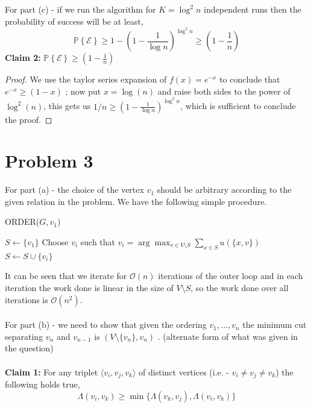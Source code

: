 \documentclass{article}
\numberwithin{equation}{section}
\newcommand{\bigOh}[1]{\mathcal{O}\left(#1\right)}
\newcommand{\curlyBrace}[1]{\left\{#1\right\}}
\newcommand{\roundBrace}[1]{\left(#1\right)}
\newcommand{\probsymb}[1]{\mathbb{P}\curlyBrace{#1}}
\begin{document}
\noindent For part (c) - if we run the algorithm for  $K = \log^2 n$ independent runs then the probability of success will be at least, 
\begin{equation}
    \probsymb{\mathcal{E}} \ge 1 - \roundBrace{1 - \frac{1}{\log n}}^{\log^2 n} \ge \roundBrace{1- \frac{1}{n}}
\end{equation}
\textbf{Claim 2:} $\probsymb{\mathcal{E}} 
\ge \roundBrace{1- \frac{1}{n}}$
\begin{proof}
    We use the taylor series expansion of $f(x) = e^{-x}$ to conclude that $e^{-x}\ge (1-x)$ ; now put $x = \log(n)$ and raise both sides to the power of $\log^2(n)$, this gets us $1/n \ge \roundBrace{1 - \frac{1}{\log n}}^{\log^2 n}$, which is sufficient to conclude the proof. 
\end{proof}
\newpage
\section{Problem 3} %
For part (a) - the choice of the vertex $v_1$ should be arbitrary according to the given relation in the problem. We have the following simple procedure.
\begin{algorithm}[H]
    \caption{ORDER($G, v_1$)}
    \begin{algorithmic}[1]
        \State $S\leftarrow\{v_1\}$ 
            \State Choose $v_i$ such that $v_i = \arg\max_{v \in V\setminus S} \sum_{x \in S} u(\{x, v\})$ 
            \State $S\leftarrow S\cup \{v_i\}$ 
        \EndFor
    \end{algorithmic}
\end{algorithm}
It can be seen that we iterate for $\bigOh{n}$ iterations of the outer loop and in each iteration the work done is linear in the size of $V\setminus S$, so the work done over all iterations is $\bigOh{n^2}$. \\\\
For part (b) - we need to show that given the ordering $v_1, \dots, v_n$ the minimum cut separating $v_n$ and $v_{n-1}$ is $(V\setminus\{v_n\}, v_n)$ . (alternate form of what was given in the question)\\\\
\textbf{Claim 1:} For any triplet $\langle v_i, v_j, v_k\rangle$ of distinct vertices (i.e. - $v_i\not=v_j\not=v_k$) the following holds true, 
\begin{equation}
    \label{e4}
    \Lambda(v_i, v_k) \ge \min\{\Lambda(v_k, v_j), \Lambda(v_i, v_k)\}
\end{equation}
\end{document}
